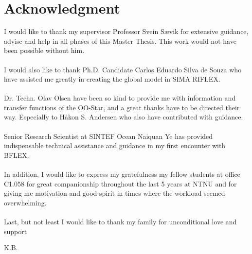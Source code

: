 \chapter*{Acknowledgment}
I would like to thank my supervisor Professor Svein Sævik for extensive guidance, advise and help in all phases of this Master Thesis. This work would not have been possible without him. \\\\I would also like to thank Ph.D. Candidate Carlos Eduardo Silva de Souza who have assisted me greatly in creating the global model in SIMA RIFLEX. \\\\  Dr. Techn. Olav Olsen have been so kind to provide me with information and transfer functions of the OO-Star, and a great thanks have to be directed their way. Especially to Håkon S. Andersen who also have contributed with guidance. \\\\ Senior Research Scientist at SINTEF Ocean Naiquan Ye has provided indispensable technical assistance and guidance in my first encounter with BFLEX. \\\\ In addition, I would like to express my gratefulness my fellow students at office C1.058 for great companionship throughout the last 5 years at NTNU and for giving me motivation and good spirit in times where the workload seemed overwhelming. \\\\ Last, but not least I would like to thank my family for unconditional love and support


\newline
\newline
\newline

\begin{flushright}
K.B.
\end{flushright}

